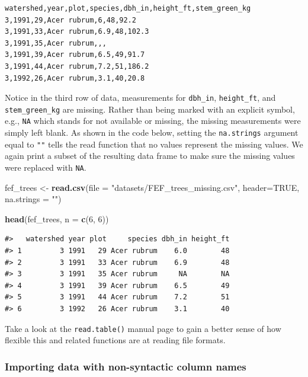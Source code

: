 \documentclass[
  11pt,
]{krantz}
\newenvironment{Shaded}{\begin{snugshade}}{\end{snugshade}}
\newcommand{\DataTypeTok}[1]{\textcolor[rgb]{0.13,0.29,0.53}{#1}}
\newcommand{\DecValTok}[1]{\textcolor[rgb]{0.00,0.00,0.81}{#1}}
\newcommand{\KeywordTok}[1]{\textcolor[rgb]{0.13,0.29,0.53}{\textbf{#1}}}
\newcommand{\NormalTok}[1]{#1}
\newcommand{\OtherTok}[1]{\textcolor[rgb]{0.56,0.35,0.01}{#1}}
\newcommand{\StringTok}[1]{\textcolor[rgb]{0.31,0.60,0.02}{#1}}
\theoremstyle{definition}
\theoremstyle{definition}
\theoremstyle{definition}
\theoremstyle{definition}
\theoremstyle{remark}
\begin{document}
\begin{verbatim}
watershed,year,plot,species,dbh_in,height_ft,stem_green_kg
3,1991,29,Acer rubrum,6,48,92.2
3,1991,33,Acer rubrum,6.9,48,102.3
3,1991,35,Acer rubrum,,,
3,1991,39,Acer rubrum,6.5,49,91.7
3,1991,44,Acer rubrum,7.2,51,186.2
3,1992,26,Acer rubrum,3.1,40,20.8
\end{verbatim}

Notice in the third row of data, measurements for \texttt{dbh\_in}, \texttt{height\_ft}, and \texttt{stem\_green\_kg} are missing. Rather than being marked with an explicit symbol, e.g., \texttt{NA} which stands for not available or missing, the missing measurements were simply left blank. As shown in the code below, setting the \texttt{na.strings} argument equal to \texttt{""} tells the read function that no values represent the missing values. We again print a subset of the resulting data frame to make sure the missing values were replaced with \texttt{NA}.

\begin{Shaded}
\begin{Highlighting}[]
\NormalTok{fef\_trees \textless{}{-}}\StringTok{ }\KeywordTok{read.csv}\NormalTok{(}\DataTypeTok{file =} \StringTok{"datasets/FEF\_trees\_missing.csv"}\NormalTok{,}
                      \DataTypeTok{header=}\OtherTok{TRUE}\NormalTok{, }\DataTypeTok{na.strings =} \StringTok{""}\NormalTok{)}

\KeywordTok{head}\NormalTok{(fef\_trees, }\DataTypeTok{n =} \KeywordTok{c}\NormalTok{(}\DecValTok{6}\NormalTok{, }\DecValTok{6}\NormalTok{)) }
\end{Highlighting}
\end{Shaded}

\begin{verbatim}
#>   watershed year plot     species dbh_in height_ft
#> 1         3 1991   29 Acer rubrum    6.0        48
#> 2         3 1991   33 Acer rubrum    6.9        48
#> 3         3 1991   35 Acer rubrum     NA        NA
#> 4         3 1991   39 Acer rubrum    6.5        49
#> 5         3 1991   44 Acer rubrum    7.2        51
#> 6         3 1992   26 Acer rubrum    3.1        40
\end{verbatim}

Take a look at the \texttt{read.table()} manual page to gain a better sense of how flexible this and related functions are at reading file formats.

\hypertarget{importing-data-with-non-syntactic-column-names}{%
\subsubsection*{Importing data with non-syntactic column names}\label{importing-data-with-non-syntactic-column-names}}
\end{document}
